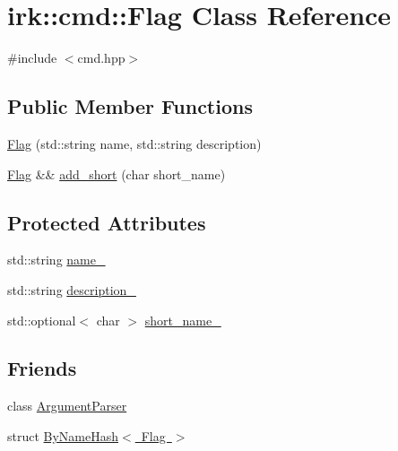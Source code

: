 \hypertarget{classirk_1_1cmd_1_1Flag}{}\section{irk\+:\+:cmd\+:\+:Flag Class Reference}
\label{classirk_1_1cmd_1_1Flag}


{\ttfamily \#include $<$cmd.\+hpp$>$}

\subsection*{Public Member Functions}
\begin{DoxyCompactItemize}
\item 
\mbox{\hyperlink{classirk_1_1cmd_1_1Flag_afddd401a8eeed72d80ab84b94a567a4a}{Flag}} (std\+::string name, std\+::string description)
\item 
\mbox{\hyperlink{classirk_1_1cmd_1_1Flag}{Flag}} \&\& \mbox{\hyperlink{classirk_1_1cmd_1_1Flag_a891b2967245f4299c7ee4d822ce9fc72}{add\+\_\+short}} (char short\+\_\+name)
\end{DoxyCompactItemize}
\subsection*{Protected Attributes}
\begin{DoxyCompactItemize}
\item 
std\+::string \mbox{\hyperlink{classirk_1_1cmd_1_1Flag_a68b6c570a6ec11aa6a27af60e0eed538}{name\+\_\+}}
\item 
std\+::string \mbox{\hyperlink{classirk_1_1cmd_1_1Flag_a575b036b34f614835c77c0d86081dfe3}{description\+\_\+}}
\item 
std\+::optional$<$ char $>$ \mbox{\hyperlink{classirk_1_1cmd_1_1Flag_a0b7a506b5ad1630cd78582c2dfcd4445}{short\+\_\+name\+\_\+}}
\end{DoxyCompactItemize}
\subsection*{Friends}
\begin{DoxyCompactItemize}
\item 
class \mbox{\hyperlink{classirk_1_1cmd_1_1Flag_a55c9e1ac006a645af402e3aee6b64e00}{Argument\+Parser}}
\item 
struct \mbox{\hyperlink{classirk_1_1cmd_1_1Flag_ac108a43e1fe1a47dcdb8a9d1fd59ec0e}{By\+Name\+Hash$<$ Flag $>$}}
\end{DoxyCompactItemize}


